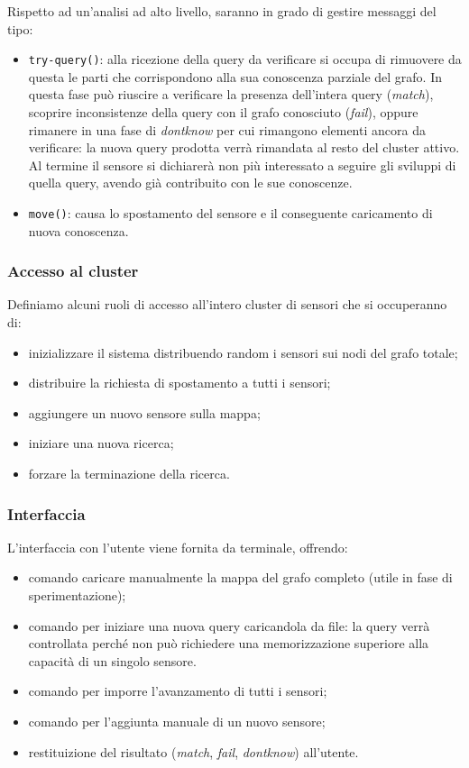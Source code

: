 \documentclass{llncs}
\begin{document}
Rispetto ad un'analisi ad alto livello,
saranno in grado di gestire messaggi del tipo:
\begin{itemize}
\item \texttt{try-query()}: alla ricezione della query da verificare
  si occupa di rimuovere da questa le parti che corrispondono alla
  sua conoscenza parziale del grafo. In questa fase può riuscire a
  verificare la presenza dell'intera query (\emph{match}),
  scoprire inconsistenze della query con il grafo conosciuto
  (\emph{fail}), oppure rimanere in una fase di \emph{dontknow}
  per cui rimangono elementi ancora da verificare: la nuova query
  prodotta verrà rimandata al resto del cluster attivo.
  Al termine il sensore si dichiarerà non più interessato a seguire
  gli sviluppi di quella query, avendo già contribuito con le
  sue conoscenze.
\item \texttt{move()}: causa lo spostamento del sensore e il
  conseguente caricamento di nuova conoscenza.
\end{itemize}

\subsubsection*{Accesso al cluster}
Definiamo alcuni ruoli di accesso all'intero cluster di sensori
che si occuperanno di:
\begin{itemize}
\item inizializzare il sistema distribuendo random i sensori sui
  nodi del grafo totale;
\item distribuire la richiesta di spostamento a tutti i sensori;
\item aggiungere un nuovo sensore sulla mappa;
\item iniziare una nuova ricerca;
\item forzare la terminazione della ricerca.
\end{itemize}

\subsubsection*{Interfaccia}
L'interfaccia con l'utente viene fornita da terminale, offrendo:
\begin{itemize}
\item comando caricare manualmente la mappa del grafo
  completo (utile in fase di sperimentazione);
\item comando per iniziare una nuova query caricandola da file:
  la query verrà controllata perché non può richiedere una
  memorizzazione superiore alla capacità di un singolo sensore.
\item comando per imporre l'avanzamento di tutti i sensori;
\item comando per l'aggiunta manuale di un nuovo sensore;
\item restituizione del risultato (\emph{match}, \emph{fail},
  \emph{dontknow}) all'utente.
\end{itemize}
\end{document}
